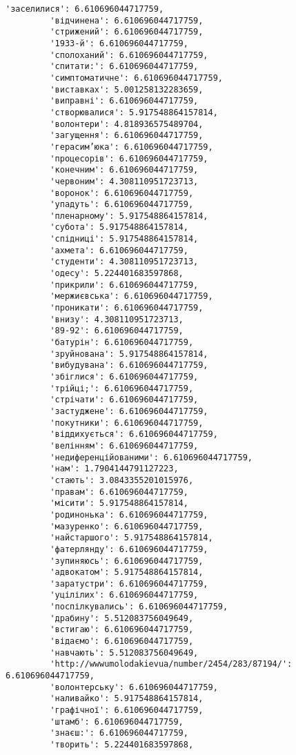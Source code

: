 \documentclass[11pt]{article}
\begin{document}
\begin{Verbatim}[commandchars=\\\{\}]
         'заселилися': 6.610696044717759,
         'відчинена': 6.610696044717759,
         'стрижений': 6.610696044717759,
         '1933-й': 6.610696044717759,
         'сполоханий': 6.610696044717759,
         'спитати:': 6.610696044717759,
         'симптоматичне': 6.610696044717759,
         'виставках': 5.001258132283659,
         'виправні': 6.610696044717759,
         'створювалися': 5.917548864157814,
         'волонтери': 4.818936575489704,
         'загущення': 6.610696044717759,
         'герасим’юка': 6.610696044717759,
         'процесорів': 6.610696044717759,
         'конечним': 6.610696044717759,
         'червоним': 4.308110951723713,
         'воронок': 6.610696044717759,
         'упадуть': 6.610696044717759,
         'пленарному': 5.917548864157814,
         'субота': 5.917548864157814,
         'спідниці': 5.917548864157814,
         'ахмета': 6.610696044717759,
         'студенти': 4.308110951723713,
         'одесу': 5.224401683597868,
         'прикрили': 6.610696044717759,
         'мержиєвська': 6.610696044717759,
         'проникати': 6.610696044717759,
         'внизу': 4.308110951723713,
         '89-92': 6.610696044717759,
         'батурін': 6.610696044717759,
         'зруйнована': 5.917548864157814,
         'вибудувана': 6.610696044717759,
         'збіглися': 6.610696044717759,
         'трійці;': 6.610696044717759,
         'стрічати': 6.610696044717759,
         'застуджене': 6.610696044717759,
         'покутники': 6.610696044717759,
         'віддихується': 6.610696044717759,
         'велінням': 6.610696044717759,
         'недиференційованими': 6.610696044717759,
         'нам': 1.7904144791127223,
         'стають': 3.0843355201015976,
         'правам': 6.610696044717759,
         'місити': 5.917548864157814,
         'родинонька': 6.610696044717759,
         'мазуренко': 6.610696044717759,
         'найстаршого': 5.917548864157814,
         'фатерлянду': 6.610696044717759,
         'зупиняюсь': 6.610696044717759,
         'адвокатом': 5.917548864157814,
         'заратустри': 6.610696044717759,
         'уцілілих': 6.610696044717759,
         'поспілкувались': 6.610696044717759,
         'драбину': 5.512083756049649,
         'встигаю': 6.610696044717759,
         'відаємо': 6.610696044717759,
         'навчають': 5.512083756049649,
         'http://wwwumolodakievua/number/2454/283/87194/': 6.610696044717759,
         'волонтерську': 6.610696044717759,
         'наливайко': 5.917548864157814,
         'графічної': 6.610696044717759,
         'штамб': 6.610696044717759,
         'знаєш:': 6.610696044717759,
         'творить': 5.224401683597868,

\end{Verbatim}
\end{document}
